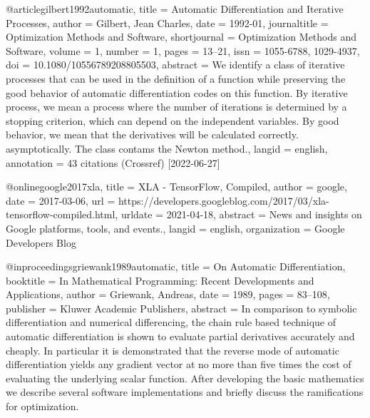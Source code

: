 @article{gilbert1992automatic,
  title = {Automatic Differentiation and Iterative Processes},
  author = {Gilbert, Jean Charles},
  date = {1992-01},
  journaltitle = {Optimization Methods and Software},
  shortjournal = {Optimization Methods and Software},
  volume = {1},
  number = {1},
  pages = {13--21},
  issn = {1055-6788, 1029-4937},
  doi = {10.1080/10556789208805503},
  abstract = {We identify a class of iterative processes that can be used in the definition of a function while preserving the good behavior of automatic differentiation codes on this function. By iterative process, we mean a process where the number of iterations is determined by a stopping criterion, which can depend on the independent variables. By good behavior, we mean that the derivatives will be calculated correctly. asymptotically. The class contams the Newton method.},
  langid = {english},
  annotation = {43 citations (Crossref) [2022-06-27]}
}


@online{google2017xla,
  title = {{{XLA}} - {{TensorFlow}}, Compiled},
  author = {{google}},
  date = {2017-03-06},
  url = {https://developers.googleblog.com/2017/03/xla-tensorflow-compiled.html},
  urldate = {2021-04-18},
  abstract = {News and insights on Google platforms, tools, and events.},
  langid = {english},
  organization = {Google Developers Blog}
}

@inproceedings{griewank1989automatic,
  title = {On {{Automatic Differentiation}}},
  booktitle = {In {{Mathematical Programming}}: {{Recent Developments}} and {{Applications}}},
  author = {Griewank, Andreas},
  date = {1989},
  pages = {83--108},
  publisher = {Kluwer Academic Publishers},
  abstract = {In comparison to symbolic differentiation and numerical differencing, the chain rule based technique of automatic differentiation is shown to evaluate partial derivatives accurately and cheaply. In particular it is demonstrated that the reverse mode of automatic differentiation yields any gradient vector at no more than five times the cost of evaluating the underlying scalar function. After developing the basic mathematics we describe several software implementations and briefly discuss the ramifications for optimization.}
}

